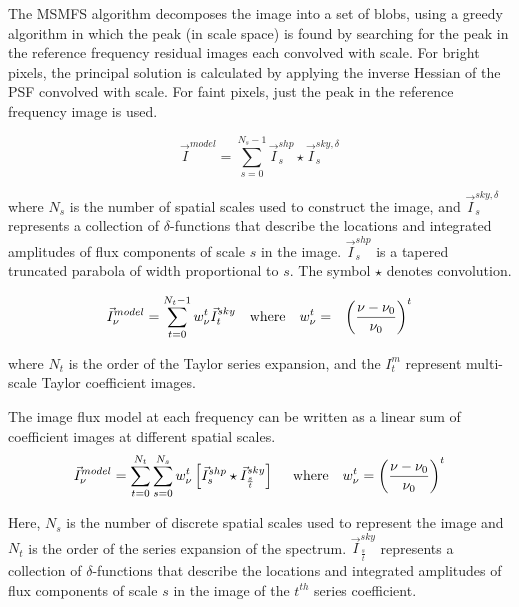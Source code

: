 \documentclass[11pt,a4paper]{article}
\begin{document}
The MSMFS algorithm decomposes the image into a set of blobs, using a greedy algorithm in which the peak (in scale space) is found by searching for the peak in the reference frequency residual images each convolved with scale. For bright pixels, the principal solution is calculated by applying the inverse Hessian of the PSF convolved with scale. For faint pixels, just the peak in the reference frequency image is used.

\begin{equation}
\vec{I}^{model} = \sum_{s=0}^{N_s-1}  \vec{I}^{shp}_{s} \star \vec{I}^{sky,\delta}_s
\label{Eq:ms_model}
\end{equation}

where $N_s$ is the number of spatial scales used to construct the image, and
$\vec{I}^{sky,\delta}_{s}$ represents a collection of $\delta$-functions that describe the locations
and integrated amplitudes of flux components of scale $s$ in the image. $\vec{I}^{shp}_s$ is a tapered truncated parabola of width proportional to $s$.
The symbol $\star$ denotes convolution. 

\begin{eqnarray}
\label{eqn:mf_model}
\vec{I}^{model}_{\nu} = \sum_{t=0}^{N_t-1} {w_{\nu}^t} \vec{I}^{sky}_{t} ~~~\mathrm{where}~~~ {w_{\nu}^t}&=&{\left(\frac{\nu-\nu_0}{\nu_0}\right)}^t 
\end{eqnarray}

where $N_t$ is the order of the Taylor series expansion, and 
the $I^m_t$ represent multi-scale Taylor coefficient images.

The image flux model at each frequency can be written as a linear sum of  
coefficient images at different spatial scales. 
\begin{equation}
\vec{I}^{model}_{\nu} = \sum_{t=0}^{N_t} \sum_{s=0}^{N_s} {w_{\nu}^t} \left[ \vec{I}^{shp}_s \star \vec{I}^{sky}_\frac{s}{t}\right] ~~~~\mathrm{where}~~~{w_{\nu}^t} = {\left(\frac{\nu-\nu_0}{\nu_0}\right)}^t 
\label{eqn:msmf_model}
\end{equation}

Here, $N_s$ is the number of discrete spatial scales used to represent the image and  
$N_t$ is the order of the series expansion of the spectrum. $\vec{I}^{sky}_\frac{s}{t}$ represents 
a collection of $\delta$-functions that describe the locations
and integrated amplitudes of flux components of scale $s$ in the image of the $t^{th}$ series 
coefficient. 
\end{document}
